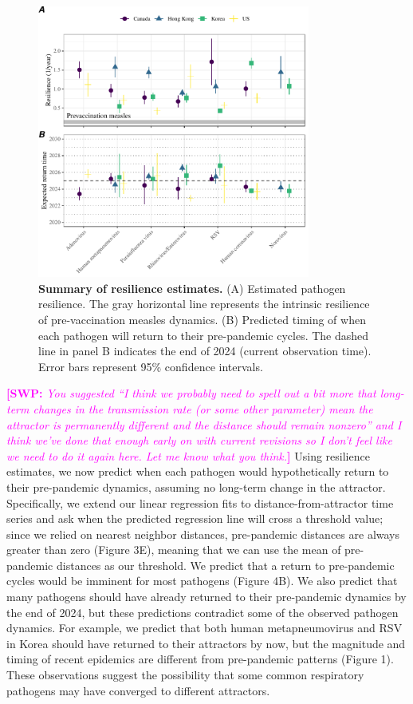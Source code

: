 \documentclass[12pt]{article}
\newcommand{\comment}{\showcomment}
\newcommand{\showcomment}[3]{\textcolor{#1}{\textbf{[#2: }\textsl{#3}\textbf{]}}}
\newcommand{\swp}[1]{\comment{magenta}{SWP}{#1}}
\begin{document}
\begin{figure}[!th]
\begin{center}
\includegraphics[width=0.8\textwidth]{../figure4/figure4.pdf}
\caption{
\textbf{Summary of resilience estimates.}
(A) Estimated pathogen resilience.
The gray horizontal line represents the intrinsic resilience of pre-vaccination measles dynamics.
(B) Predicted timing of when each pathogen will return to their pre-pandemic cycles.
The dashed line in panel B indicates the end of 2024 (current observation time).
Error bars represent 95\% confidence intervals.
}
\end{center}
\end{figure}

\swp{You suggested ``I think we probably need to spell out a bit more that long-term changes in the transmission rate (or some other parameter) mean the attractor is permanently different and the distance should remain nonzero'' and I think we've done that enough early on with current revisions so I don't feel like we need to do it again here. Let me know what you think.}
Using resilience estimates, we now predict when each pathogen would hypothetically return to their pre-pandemic dynamics, assuming no long-term change in the attractor.
Specifically, we extend our linear regression fits to distance-from-attractor time series and ask when the predicted regression line will cross a threshold value;
since we relied on nearest neighbor distances, pre-pandemic distances are always greater than zero (Figure 3E), meaning that we can use the mean of pre-pandemic distances as our threshold.
We predict that a return to pre-pandemic cycles would be imminent for most pathogens (Figure 4B).
We also predict that many pathogens should have already returned to their pre-pandemic dynamics by the end of 2024, but these predictions contradict some of the observed pathogen dynamics.
For example, we predict that both human metapneumovirus and RSV in Korea should have returned to their attractors by now, but the magnitude and timing of recent epidemics are different from pre-pandemic patterns (Figure 1). 
These observations suggest the possibility that some common respiratory pathogens may have converged to different attractors.
\end{document}
